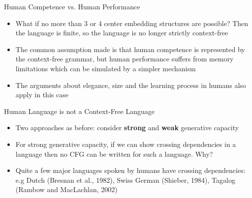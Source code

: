 \documentclass[landscape]{slides}
\begin{document}
\begin{slide}{Human Competence vs. Human Performance}
\begin{itemize}
\item What if no more than 3 or 4 center embedding structures are possible? Then the language is finite, so the language is no longer strictly context-free
\item The common assumption made is that human competence is represented by the context-free grammar, but human performance suffers from memory limitations which can be simulated by a simpler mechanism
\item The arguments about elegance, size and the learning process in humans also apply in this case
\end{itemize}
\end{slide}

\begin{slide}{Human Language is not a Context-Free Language}
\begin{itemize}
\item Two approaches as before: consider {\bf strong} and {\bf weak} generative capacity
\item For strong generative capacity, if we can show crossing dependencies in a language then no CFG can be written for such a language. {\color{red} Why?}
\item Quite a few major languages spoken by humans have crossing dependencies: \\
e.g Dutch (Bresnan et al., 1982), Swiss German (Shieber, 1984), Tagalog (Rambow and MacLachlan, 2002)
\end{itemize}
\end{slide}
\end{document}
